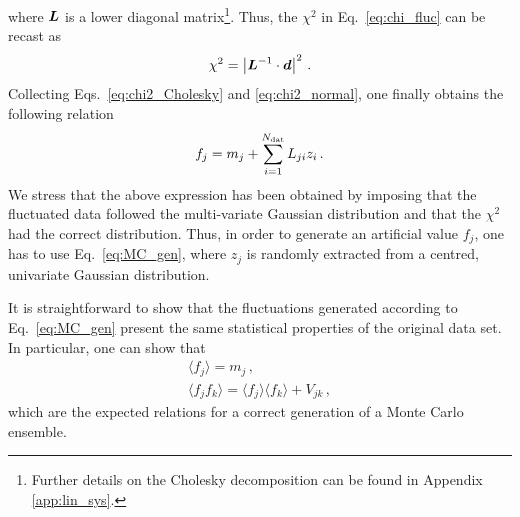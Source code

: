 where $\vb*{L}$ is a lower diagonal matrix\footnote{Further details on the Cholesky decomposition can be found in Appendix \ref{app:lin_sys}.}. Thus, the $\chi^2$ in Eq.~\eqref{eq:chi_fluc} can be recast as
\begin{equation}
  \chi^2 = \left| \vb*{L}^{-1} \cdot \vb*{d} \right|^2 \,.
  \label{eq:chi2_Cholesky}
\end{equation}
Collecting Eqs.~\eqref{eq:chi2_Cholesky} and \eqref{eq:chi2_normal}, one finally obtains the following relation
\begin{equation}
  f_j = m_j + \sum_{i=1}^{N_{\textrm{dat}}} L_{ji} z_i\,.
  \label{eq:MC_gen}
\end{equation}
We stress that the above expression has been obtained by imposing that the fluctuated data followed the multi-variate Gaussian distribution and that the $\chi^2$ had the correct distribution. Thus, in order to generate an artificial value $f_j$, one has to use Eq.~\eqref{eq:MC_gen}, where $z_j$ is randomly extracted from a centred, univariate Gaussian distribution.\par
It is straightforward to show that the fluctuations generated according to Eq.~\eqref{eq:MC_gen} present the same statistical properties of the original data set. In particular, one can show that
\begin{gather}
  \langle f_j \rangle = m_j \,,\\
  \langle f_j f_k \rangle = \langle f_j \rangle \langle f_k \rangle + V_{jk} \,,
\end{gather}
which are the expected relations for a correct generation of a Monte Carlo ensemble.

